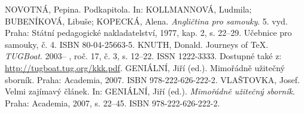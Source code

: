 \documentclass{article}
\begin{document}
\begin{thebibliography}{99}
  NOVOTNÁ, Pepina. Podkapitola. In: KOLLMANNOVÁ, Ludmila; BUBENÍKOVÁ, Libuše; KOPECKÁ, Alena. \emph{Angličtina pro samouky}. 5. vyd. Praha: Státní pedagogické nakladatelství, 1977, kap. 2, s. 22--29. Učebnice pro samouky, č. 4. ISBN 80-04-25663-5.
  KNUTH, Donald. Journeys of \TeX. \emph{TUGBoat}. 2003-- , roč. 17, č. 3, s. 12--22. ISSN 1222-3333. Dostupné také z: \url{http://tugboat.tug.org/kkk.pdf}.
  GENIÁLNÍ, Jiří (ed.). Mimořádně užitečný sborník. Praha: Academia, 2007. ISBN 978-222-626-222-2.
  VLAŠTOVKA, Josef. Velmi zajímavý článek. In: GENIÁLNÍ, Jiří (ed.). \emph{Mimořádně užitečný sborník}. Praha: Academia, 2007, s. 22--45. ISBN 978-222-626-222-2.

\end{thebibliography}
\end{document}
